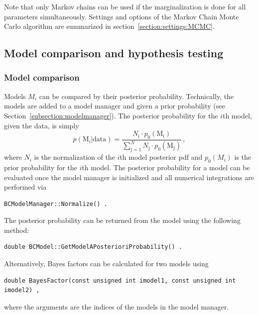 \documentclass[11pt, a4paper]{article}
\begin{document}
\noindent
Note that only Markov chains can be used if the marginalization is
done for all parameters simultaneously. Settings and options of the
Markov Chain Monte Carlo algorithm are summarized in
section~\ref{section:settings:MCMC}. \\


\subsection{Model comparison and hypothesis testing}


\subsubsection{Model comparison}

Models $M_{i}$ can be compared by their posterior
probability. Technically, the models are added to a model manager and
given a prior probability (see
Section~\ref{subsection:modelmanager}). The posterior probability for
the $i$th model, given the data, is simply
%
\begin{equation}
p(\mathrm{M_{i}}|\mathrm{data}) = \frac{N_{\mathrm{i}} \cdot p_{0}(\mathrm{M_{i}})}{\sum_{\mathrm{j} = 1}^{N} N_{\mathrm{j}} \cdot p_{0}(\mathrm{M_{j}})} \, ,
\end{equation}
%
where $N_{i}$ is the normalization of the $i$th model posterior pdf
and $p_{0}(M_{i})$ is the prior probability for the $i$th model. The
posterior probability for a model can be evaluated once the model
manager is initialized and all numerical integrations are performed
via
%
\begin{verbatim}
BCModelManager::Normalize() .
\end{verbatim}
%
The posterior probability can be returned from the model using the
following method:
%
\begin{verbatim}
double BCModel::GetModelAPosterioriProbability() .
\end{verbatim}

\noindent
Alternatively, Bayes factors can be calculated for two models using
%
\begin{verbatim}
double BayesFactor(const unsigned int imodel1, const unsigned int imodel2) ,
\end{verbatim}
%
\noindent
where the arguments are the indices of the models in the model
manager.
\end{document}
